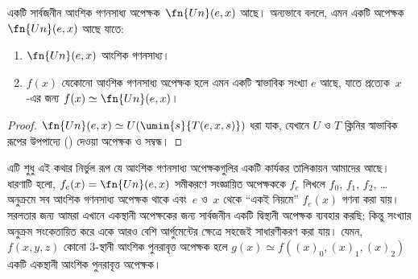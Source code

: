 \documentclass[../../../include/open-logic-section]{subfiles}
\begin{document}

\begin{thm}
একটি সার্বজনীন আংশিক গণনসাধ্য অপেক্ষক~$\fn{Un}(e,x)$ আছে। অন্যভাবে
বললে, এমন একটি অপেক্ষক $\fn{Un}(e,x)$ আছে যাতে:
\begin{enumerate}
\item $\fn{Un}(e,x)$ আংশিক গণনসাধ্য।
\item $f(x)$ যেকোনো আংশিক গণনসাধ্য অপেক্ষক হলে এমন একটি স্বাভাবিক
সংখ্যা $e$ আছে, যাতে প্রত্যেক~$x$-এর জন্য
$f(x) \simeq \fn{Un}(e,x)$।
\end{enumerate}
\end{thm}

\begin{proof}
$\fn{Un}(e,x) \simeq U(\umin{s}{T(e,x,s)})$ ধরা যাক, যেখানে $U$ ও $T$
ক্লিনির স্বাভাবিক রূপের উপপাদ্যে
() দেওয়া অপেক্ষক ও সম্বন্ধ।
\end{proof}

\begin{explain}
এটি শুধু এই কথার নির্ভুল রূপ যে আংশিক গণনসাধ্য অপেক্ষকগুলির একটি কার্যকর
তালিকায়ন আমাদের আছে। ধারণাটি হলো, $f_e(x) = \fn{Un}(e,x)$ সমীকরণে
সংজ্ঞায়িত অপেক্ষককে $f_e$ লিখলে $f_0$, $f_1$, $f_2$, \dots অনুক্রমে
সব আংশিক গণনসাধ্য অপেক্ষক থাকে এবং~$e$ ও~$x$ থেকে “একই নিয়মে”
$f_e(x)$ গণনা করা যায়। সরলতার জন্য আমরা এখানে একস্থানী অপেক্ষকের জন্য
সার্বজনীন একটি দ্বিস্থানী অপেক্ষক ব্যবহার করছি; কিন্তু সংখ্যার অনুক্রম
সংকেতায়িত করে একে আরও বেশি আর্গুমেন্টের ক্ষেত্রে সহজেই সাধারণীকরণ করা
যায়। যেমন, $f(x,y,z)$ কোনো $3$-স্থানী আংশিক পুনরাবৃত্ত অপেক্ষক হলে
$g(x) \simeq f((x)_0, (x)_1, (x)_2)$ একটি একস্থানী আংশিক পুনরাবৃত্ত
অপেক্ষক।
\end{explain}
\end{document}
